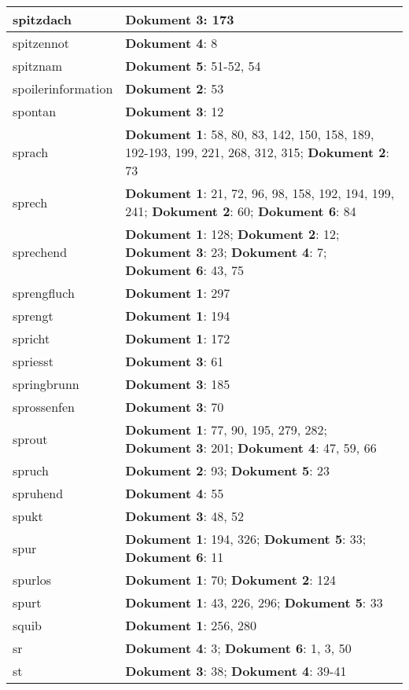 \documentclass[a5paper]{article}
\begin{document}
\begin{longtable}[l]{|l|p{3in}|}
\hline
spitzdach & \textbf{Dokument 3}: 173 \\
\hline
spitzennot & \textbf{Dokument 4}: 8 \\
\hline
spitznam & \textbf{Dokument 5}: 51-52, 54 \\
\hline
spoilerinformation & \textbf{Dokument 2}: 53 \\
\hline
spontan & \textbf{Dokument 3}: 12 \\
\hline
sprach & \textbf{Dokument 1}: 58, 80, 83, 142, 150, 158, 189, 192-193, 199, 221, 268, 312, 315; \textbf{Dokument 2}: 73 \\
\hline
sprech & \textbf{Dokument 1}: 21, 72, 96, 98, 158, 192, 194, 199, 241; \textbf{Dokument 2}: 60; \textbf{Dokument 6}: 84 \\
\hline
sprechend & \textbf{Dokument 1}: 128; \textbf{Dokument 2}: 12; \textbf{Dokument 3}: 23; \textbf{Dokument 4}: 7; \textbf{Dokument 6}: 43, 75 \\
\hline
sprengfluch & \textbf{Dokument 1}: 297 \\
\hline
sprengt & \textbf{Dokument 1}: 194 \\
\hline
spricht & \textbf{Dokument 1}: 172 \\
\hline
spriesst & \textbf{Dokument 3}: 61 \\
\hline
springbrunn & \textbf{Dokument 3}: 185 \\
\hline
sprossenfen & \textbf{Dokument 3}: 70 \\
\hline
sprout & \textbf{Dokument 1}: 77, 90, 195, 279, 282; \textbf{Dokument 3}: 201; \textbf{Dokument 4}: 47, 59, 66 \\
\hline
spruch & \textbf{Dokument 2}: 93; \textbf{Dokument 5}: 23 \\
\hline
spruhend & \textbf{Dokument 4}: 55 \\
\hline
spukt & \textbf{Dokument 3}: 48, 52 \\
\hline
spur & \textbf{Dokument 1}: 194, 326; \textbf{Dokument 5}: 33; \textbf{Dokument 6}: 11 \\
\hline
spurlos & \textbf{Dokument 1}: 70; \textbf{Dokument 2}: 124 \\
\hline
spurt & \textbf{Dokument 1}: 43, 226, 296; \textbf{Dokument 5}: 33 \\
\hline
squib & \textbf{Dokument 1}: 256, 280 \\
\hline
sr & \textbf{Dokument 4}: 3; \textbf{Dokument 6}: 1, 3, 50 \\
\hline
st & \textbf{Dokument 3}: 38; \textbf{Dokument 4}: 39-41 \\

\end{longtable}
\end{document}
